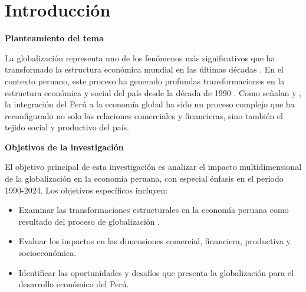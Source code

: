 \documentclass[12pt, a4paper]{article}
\begin{document}

\tableofcontents
\newpage

\section{Introducción}

\textbf{Planteamiento del tema}  

La globalización representa uno de los fenómenos más significativos que ha transformado la estructura económica mundial en las últimas décadas \parencite{stiglitz2002}. En el contexto peruano, este proceso ha generado profundas transformaciones en la estructura económica y social del país desde la década de 1990 \parencite{dancourt2016}. Como señalan \textcite{contreras2018} y \textcite{parodi2015}, la integración del Perú a la economía global ha sido un proceso complejo que ha reconfigurado no solo las relaciones comerciales y financieras, sino también el tejido social y productivo del país.

\textbf{Objetivos de la investigación}  

El objetivo principal de esta investigación es analizar el impacto multidimensional de la globalización en la economía peruana, con especial énfasis en el período 1990-2024. Los objetivos específicos incluyen:

\begin{itemize}
    \item Examinar las transformaciones estructurales en la economía peruana como resultado del proceso de globalización .
    \item Evaluar los impactos en las dimensiones comercial, financiera, productiva y socioeconómica.
    \item Identificar las oportunidades y desafíos que presenta la globalización para el desarrollo económico del Perú.
\end{itemize}
\end{document}
